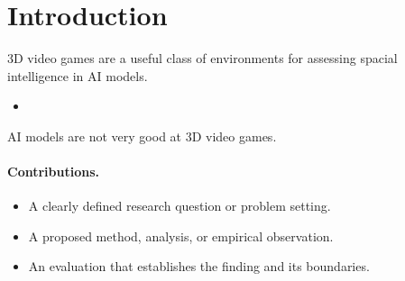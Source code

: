 \section{Introduction}
\label{sec:introduction}
3D video games are a useful class of environments for assessing spacial intelligence in AI models.
\begin{itemize}
  \item
\end{itemize}
AI models are not very good at 3D video games. 

\paragraph{Contributions.}
\begin{itemize}
  \item A clearly defined research question or problem setting.
  \item A proposed method, analysis, or empirical observation.
  \item An evaluation that establishes the finding and its boundaries.
\end{itemize}
